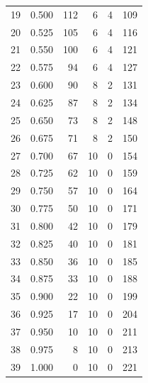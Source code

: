 \documentclass[a4paper,twoside,12pt]{book}
\begin{document}
\begin{appendices}
\begin{table}
\begin{tabular}{lrrrrr}
		19 &  0.500 &       112 &         6 &               4 &             109 \\
		20 &  0.525 &       105 &         6 &               4 &             116 \\
		21 &  0.550 &       100 &         6 &               4 &             121 \\
		22 &  0.575 &        94 &         6 &               4 &             127 \\
		23 &  0.600 &        90 &         8 &               2 &             131 \\
		24 &  0.625 &        87 &         8 &               2 &             134 \\
		25 &  0.650 &        73 &         8 &               2 &             148 \\
		26 &  0.675 &        71 &         8 &               2 &             150 \\
		27 &  0.700 &        67 &        10 &               0 &             154 \\
		28 &  0.725 &        62 &        10 &               0 &             159 \\
		29 &  0.750 &        57 &        10 &               0 &             164 \\
		30 &  0.775 &        50 &        10 &               0 &             171 \\
		31 &  0.800 &        42 &        10 &               0 &             179 \\
		32 &  0.825 &        40 &        10 &               0 &             181 \\
		33 &  0.850 &        36 &        10 &               0 &             185 \\
		34 &  0.875 &        33 &        10 &               0 &             188 \\
		35 &  0.900 &        22 &        10 &               0 &             199 \\
		36 &  0.925 &        17 &        10 &               0 &             204 \\
		37 &  0.950 &        10 &        10 &               0 &             211 \\
		38 &  0.975 &         8 &        10 &               0 &             213 \\
		39 &  1.000 &         0 &        10 &               0 &             221 \\
		\bottomrule
	\end{tabular}
\end{table}


\end{appendices}
\end{document}
